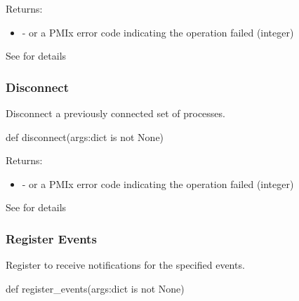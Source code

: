 Returns:
\begin{itemize}
    \item {} -  or a \ac{PMIx} error code indicating the operation failed (integer)
\end{itemize}

See  for details


\subsubsection{Disconnect}

\summary

Disconnect a previously connected set of processes.

\format

\pyspecificstart
\begin{codepar}
def disconnect(args:dict is not None)
\end{codepar}
\pyspecificend

\begin{arglist}
\end{arglist}

Returns:
\begin{itemize}
    \item {} -  or a \ac{PMIx} error code indicating the operation failed (integer)
\end{itemize}

See  for details


\subsubsection{Register Events}

\summary

Register to receive notifications for the specified events.

\format

\pyspecificstart
\begin{codepar}
def register_events(args:dict is not None)
\end{codepar}
\pyspecificend

